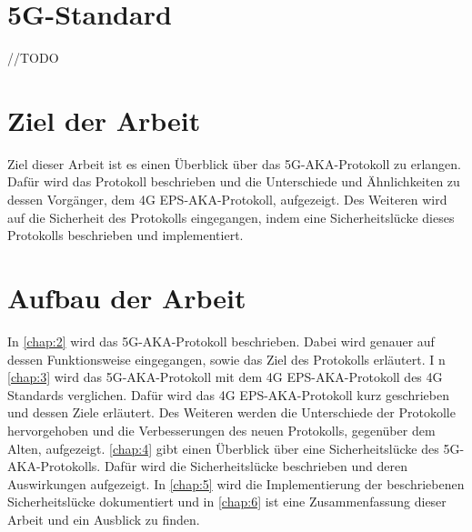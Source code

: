 \section{5G-Standard}
//TODO


\section{Ziel der Arbeit}
Ziel dieser Arbeit ist es einen \"Uberblick \"uber das 5G-AKA-Protokoll zu erlangen. Daf\"ur wird das Protokoll beschrieben und die Unterschiede und \"Ahnlichkeiten zu dessen Vorg\"anger, dem 4G EPS-AKA-Protokoll, aufgezeigt. Des Weiteren wird auf die Sicherheit des Protokolls eingegangen, indem eine Sicherheitsl\"ucke dieses Protokolls beschrieben und implementiert. %


\section{Aufbau der Arbeit}
In \cref{chap:2} wird das 5G-AKA-Protokoll beschrieben. 
Dabei wird genauer auf dessen Funktionsweise eingegangen, sowie das Ziel des Protokolls erl\"autert. I
n \cref{chap:3} wird das 5G-AKA-Protokoll mit dem 4G EPS-AKA-Protokoll des 4G Standards verglichen. 
Daf\"ur wird das 4G EPS-AKA-Protokoll kurz geschrieben und dessen Ziele erl\"autert. 
Des Weiteren werden die Unterschiede der Protokolle hervorgehoben und die Verbesserungen des neuen Protokolls, gegen\"uber dem Alten, aufgezeigt.
\cref{chap:4} gibt einen \"Uberblick \"uber eine Sicherheitsl\"ucke des 5G-AKA-Protokolls. 
Daf\"ur wird die Sicherheitsl\"ucke beschrieben und deren Auswirkungen aufgezeigt. 
In \cref{chap:5} wird die Implementierung der beschriebenen Sicherheitsl\"ucke dokumentiert und in \cref{chap:6} ist eine Zusammenfassung dieser Arbeit und ein Ausblick zu finden.

